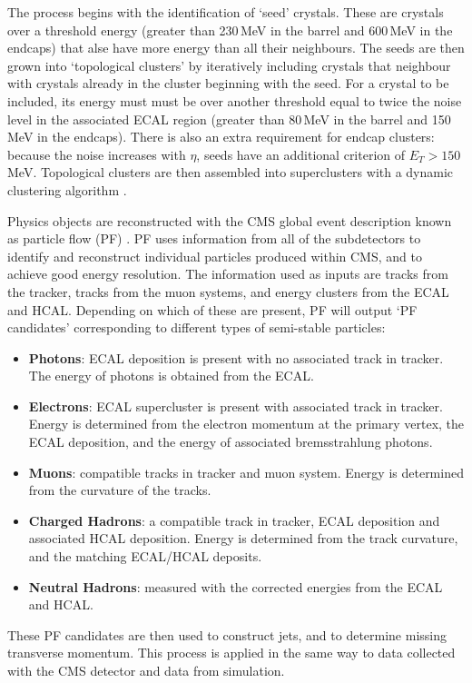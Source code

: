 The process \cite{CMSEcalTDR} begins with the identification of `seed' crystals. These are crystals over a threshold energy (greater than 230\,MeV in the barrel and 600\,MeV in the endcaps) that alse have more energy than all their neighbours.
The seeds are then grown into `topological clusters' by iteratively including crystals that neighbour with crystals already in the cluster beginning with the seed.
For a crystal to be included, its energy must must be over another threshold equal to twice the noise level in the associated ECAL region (greater than 80\,MeV in the barrel and 150\,MeV in the endcaps).
There is also an extra requirement for endcap clusters: because the noise increases with $\eta$, seeds have an additional criterion of $E_T > 150$\,MeV.
Topological clusters are then assembled into superclusters with a dynamic clustering algorithm \cite{CMSEcalTDR}.

Physics objects are reconstructed with the CMS global event description known as particle flow (PF) \cite{ParticleFlow}.
PF uses information from all of the subdetectors to identify and reconstruct individual particles produced within CMS, and to achieve good energy resolution.
The information used as inputs are tracks from the tracker, tracks from the muon systems, and energy clusters from the ECAL and HCAL. Depending on which of these are present, PF will output `PF candidates' corresponding to different types of semi-stable particles:
\begin{itemize}[noitemsep]
    \item \textbf{Photons}: ECAL deposition is present with no associated track in tracker. The energy of photons is obtained from the ECAL. 
    \item \textbf{Electrons}: ECAL supercluster is present with associated track in tracker. Energy is determined from the electron momentum at the primary vertex, the ECAL deposition, and the energy of associated bremsstrahlung photons. 
    \item \textbf{Muons}: compatible tracks in tracker and muon system. Energy is determined from the curvature of the tracks. 
    \item \textbf{Charged Hadrons}: a compatible track in tracker, ECAL deposition and associated HCAL deposition. Energy is determined from the track curvature, and the matching ECAL/HCAL deposits.
    \item \textbf{Neutral Hadrons}: measured with the corrected energies from the ECAL and HCAL. 
\end{itemize}
These PF candidates are then used to construct jets, and to determine missing transverse momentum.
This process is applied in the same way to data collected with the CMS detector and data from simulation.


